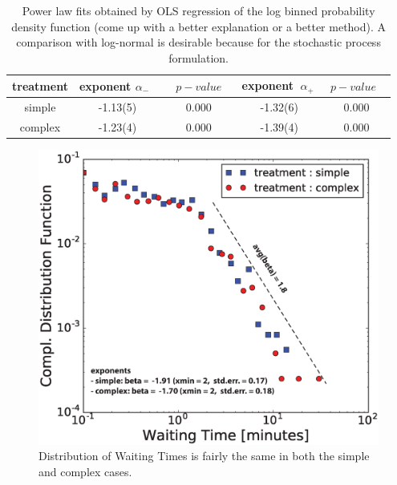 \begin{table}
  \centering 
  \begin{tabular}{|c|c|c|c|c|}
	\hline
   treatment & exponent $\alpha_{-}$~&~$~p-value~$~& exponent $~\alpha_{+}~$ & $~p-value~$~\\
   \hline
  simple  & -1.13(5) & 0.000 &  -1.32(6) & 0.000\\
  complex &  -1.23(4) & 0.000 & -1.39(4) & 0.000\\
\hline
\end{tabular}
  \caption{Power law fits obtained by OLS regression of the log binned probability density function (come up with a better explanation or a better method). A comparison with log-normal is desirable because for the stochastic process formulation.}
  \label{pwlaw_fits}
\end{table}

\begin{figure}[h!]
\begin{center}
\includegraphics[width=15cm]{figures/ccdf_waiting_time.eps}
\caption{Distribution of Waiting Times is fairly the same in both the simple and complex cases.}
\label{fig:waiting_times}
\end{center}
\end{figure}


